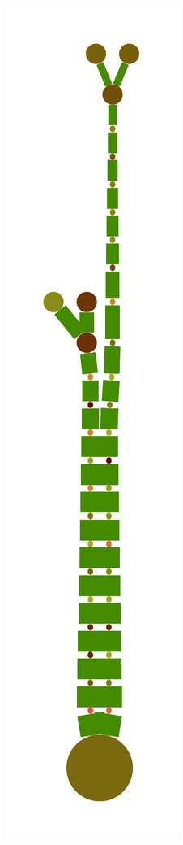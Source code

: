 \documentclass[a4paper,10pt]{article}
\begin{document}
\begin{figure}
{    \includegraphics[scale=.16]{../figures/vector/6-5-tree-induced-10.pdf}
}
\end{figure}
\end{document}
